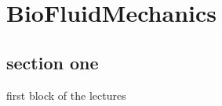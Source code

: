 \documentclass[../main.tex]{subfiles}
\begin{document}
\chapter{BioFluidMechanics}

\section{section one}

first block of the lectures
\end{document}
